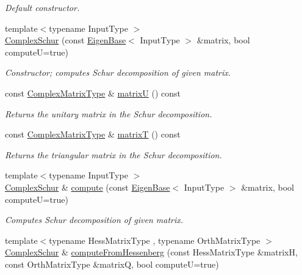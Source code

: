 \begin{DoxyCompactItemize}
\begin{DoxyCompactList}\small\item\em Default constructor. \end{DoxyCompactList}\item 
{\footnotesize template$<$typename Input\+Type $>$ }\\\hyperlink{group___eigenvalues___module_a9c92c6e4c33890d2d063c5c8dd22777d}{Complex\+Schur} (const \hyperlink{group___core___module_struct_eigen_1_1_eigen_base}{Eigen\+Base}$<$ Input\+Type $>$ \&matrix, bool computeU=true)
\begin{DoxyCompactList}\small\item\em Constructor; computes Schur decomposition of given matrix. \end{DoxyCompactList}\item 
const \hyperlink{group___eigenvalues___module_af61fe57877d51cfb50178f78534042f0}{Complex\+Matrix\+Type} \& \hyperlink{group___eigenvalues___module_afed8177cf9836f032d42bdb6c6bc6e01}{matrixU} () const
\begin{DoxyCompactList}\small\item\em Returns the unitary matrix in the Schur decomposition. \end{DoxyCompactList}\item 
const \hyperlink{group___eigenvalues___module_af61fe57877d51cfb50178f78534042f0}{Complex\+Matrix\+Type} \& \hyperlink{group___eigenvalues___module_add3ab5ed83f7f2f06b79fa910a2d5684}{matrixT} () const
\begin{DoxyCompactList}\small\item\em Returns the triangular matrix in the Schur decomposition. \end{DoxyCompactList}\item 
{\footnotesize template$<$typename Input\+Type $>$ }\\\hyperlink{group___eigenvalues___module_class_eigen_1_1_complex_schur}{Complex\+Schur} \& \hyperlink{group___eigenvalues___module_a3543d2c286563108cd9ace672bbb1c09}{compute} (const \hyperlink{group___core___module_struct_eigen_1_1_eigen_base}{Eigen\+Base}$<$ Input\+Type $>$ \&matrix, bool computeU=true)
\begin{DoxyCompactList}\small\item\em Computes Schur decomposition of given matrix. \end{DoxyCompactList}\item 
{\footnotesize template$<$typename Hess\+Matrix\+Type , typename Orth\+Matrix\+Type $>$ }\\\hyperlink{group___eigenvalues___module_class_eigen_1_1_complex_schur}{Complex\+Schur} \& \hyperlink{group___eigenvalues___module_a05dfbf329047aba756a844f8fe2de314}{compute\+From\+Hessenberg} (const Hess\+Matrix\+Type \&matrixH, const Orth\+Matrix\+Type \&matrixQ, bool computeU=true)

\end{DoxyCompactItemize}
